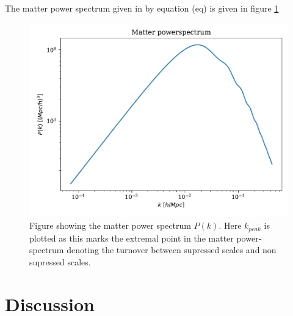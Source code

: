 \documentclass[onecolumn]{aastex62}
\begin{document}
The matter power spectrum given in by equation (eq) is given in figure \ref{fig:matter}
\begin{figure}
    \includegraphics[scale=0.8]{figures/P.pdf}
    \caption{Figure showing the matter power spectrum $P(k)$. Here $k_{peak}$ is plotted as this marks the extremal point in the matter power-spectrum denoting the turnover between supressed scales and non supressed scales.}
    \label{fig:matter}
\end{figure}

\section{Discussion}\label{sec:discussion}



\end{document}
